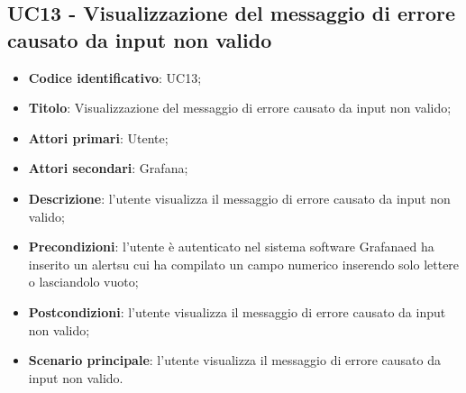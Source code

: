 \subsection{UC13 - Visualizzazione del messaggio di errore causato da input non valido}
\begin{itemize}
	\item \textbf{Codice identificativo}: UC13;
	\item \textbf{Titolo}: Visualizzazione del messaggio di errore causato da input non valido;
	\item \textbf{Attori primari}: Utente;
	\item \textbf{Attori secondari}: Grafana\glo;
	\item \textbf{Descrizione}: l'utente visualizza il messaggio di errore causato da input non valido;
	\item \textbf{Precondizioni}: l'utente è autenticato nel sistema software Grafana\glosp ed ha inserito un alert\glosp su cui ha compilato un campo numerico inserendo solo lettere o lasciandolo vuoto;
	\item \textbf{Postcondizioni}: l'utente visualizza il messaggio di errore causato da input non valido;
	\item \textbf{Scenario principale}: l'utente visualizza il messaggio di errore causato da input non valido.
\end{itemize}
